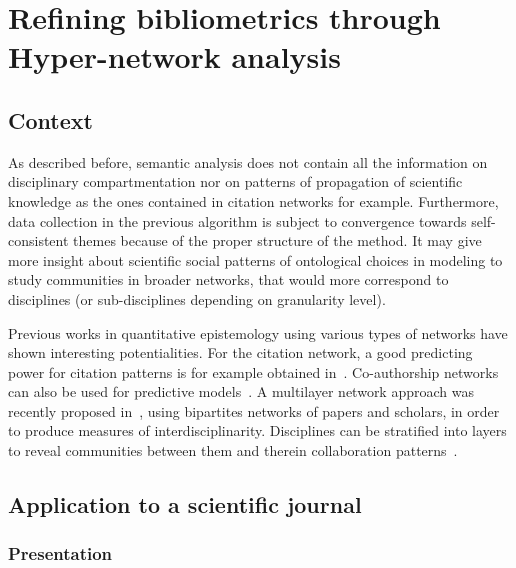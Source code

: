 
\newpage


\section{Refining bibliometrics through Hyper-network analysis}

\subsection{Context}

As described before, semantic analysis does not contain all the information on disciplinary compartmentation nor on patterns of propagation of scientific knowledge as the ones contained in citation networks for example. Furthermore, data collection in the previous algorithm is subject to convergence towards self-consistent themes because of the proper structure of the method. It may give more insight about scientific social patterns of ontological choices in modeling to study communities in broader networks, that would more correspond to disciplines (or sub-disciplines depending on granularity level).

Previous works in quantitative epistemology using various types of networks have shown interesting potentialities. For the citation network, a good predicting power for citation patterns is for example obtained in~\cite{2013arXiv1310.8220N}. Co-authorship networks can also be used for predictive models~\cite{2014arXiv1402.7268S}. A multilayer network approach was recently proposed in~\cite{2016arXiv160106075O}, using bipartites networks of papers and scholars, in order to produce measures of interdisciplinarity. Disciplines can be stratified into layers to reveal communities between them and therein collaboration patterns~\cite{2015arXiv150601280B}.

\cite{10.1371/journal.pone.0147913}







\subsection{Application to a scientific journal}

\subsubsection{Presentation}

